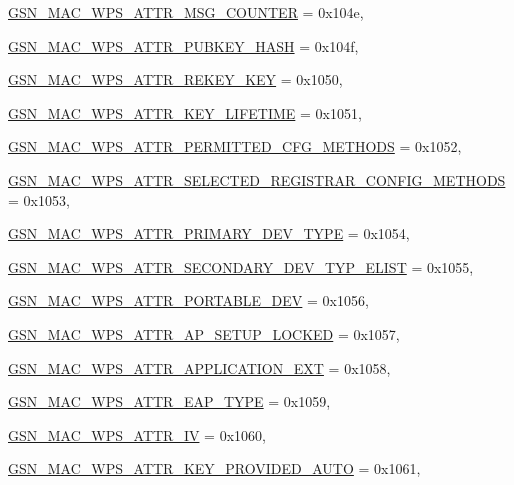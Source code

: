 \begin{DoxyCompactItemize}
\par
\hyperlink{a00642_gga0ae19d69a0b381d883890df8a7812414a6eca670b85550427017fe20b3769627a}{GSN\_\-MAC\_\-WPS\_\-ATTR\_\-MSG\_\-COUNTER} =  0x104e, 
\par
\hyperlink{a00642_gga0ae19d69a0b381d883890df8a7812414ab9823407c5f09c370cec3ebc15eaf768}{GSN\_\-MAC\_\-WPS\_\-ATTR\_\-PUBKEY\_\-HASH} =  0x104f, 
\par
\hyperlink{a00642_gga0ae19d69a0b381d883890df8a7812414a2f9230427597a54f33ebdb495ce4e875}{GSN\_\-MAC\_\-WPS\_\-ATTR\_\-REKEY\_\-KEY} =  0x1050, 
\par
\hyperlink{a00642_gga0ae19d69a0b381d883890df8a7812414a7c493d54cbe9bcdbf614d0ef1eb8c698}{GSN\_\-MAC\_\-WPS\_\-ATTR\_\-KEY\_\-LIFETIME} =  0x1051, 
\par
\hyperlink{a00642_gga0ae19d69a0b381d883890df8a7812414ad5533224919266772b2e66b15e249329}{GSN\_\-MAC\_\-WPS\_\-ATTR\_\-PERMITTED\_\-CFG\_\-METHODS} =  0x1052, 
\par
\hyperlink{a00642_gga0ae19d69a0b381d883890df8a7812414ab8085b8e758237446f2dea40d1163170}{GSN\_\-MAC\_\-WPS\_\-ATTR\_\-SELECTED\_\-REGISTRAR\_\-CONFIG\_\-METHODS} =  0x1053, 
\par
\hyperlink{a00642_gga0ae19d69a0b381d883890df8a7812414a8e09e6a61a2a303b81ee1a97ee2bdc56}{GSN\_\-MAC\_\-WPS\_\-ATTR\_\-PRIMARY\_\-DEV\_\-TYPE} =  0x1054, 
\par
\hyperlink{a00642_gga0ae19d69a0b381d883890df8a7812414aeef9d9adce9ef3a96e43ef49162e6b7e}{GSN\_\-MAC\_\-WPS\_\-ATTR\_\-SECONDARY\_\-DEV\_\-TYP\_\-ELIST} =  0x1055, 
\par
\hyperlink{a00642_gga0ae19d69a0b381d883890df8a7812414a026fdeb1d92c07881b4647872a7e4b4b}{GSN\_\-MAC\_\-WPS\_\-ATTR\_\-PORTABLE\_\-DEV} =  0x1056, 
\par
\hyperlink{a00642_gga0ae19d69a0b381d883890df8a7812414a4a5a1ab8cec5bb899989e7753a806d11}{GSN\_\-MAC\_\-WPS\_\-ATTR\_\-AP\_\-SETUP\_\-LOCKED} =  0x1057, 
\par
\hyperlink{a00642_gga0ae19d69a0b381d883890df8a7812414a229f8589f7ca2eea8cad9c8f1a45f53c}{GSN\_\-MAC\_\-WPS\_\-ATTR\_\-APPLICATION\_\-EXT} =  0x1058, 
\par
\hyperlink{a00642_gga0ae19d69a0b381d883890df8a7812414a377bf260f557239e4b247b0a00f844fc}{GSN\_\-MAC\_\-WPS\_\-ATTR\_\-EAP\_\-TYPE} =  0x1059, 
\par
\hyperlink{a00642_gga0ae19d69a0b381d883890df8a7812414a7124169a361bbebc153ff846efdaba5e}{GSN\_\-MAC\_\-WPS\_\-ATTR\_\-IV} =  0x1060, 
\par
\hyperlink{a00642_gga0ae19d69a0b381d883890df8a7812414ac27a96bcbf6bb6daaa59c46c000c8cb5}{GSN\_\-MAC\_\-WPS\_\-ATTR\_\-KEY\_\-PROVIDED\_\-AUTO} =  0x1061, 

\end{DoxyCompactItemize}
